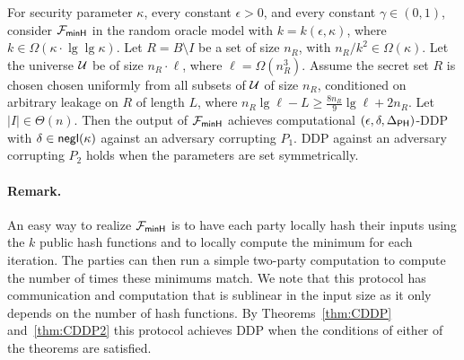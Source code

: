 \begin{theorem}\label{thm:CDDP2}
For security parameter $\kappa$, every constant $\epsilon > 0$, and every
constant $\gamma \in (0,1)$, consider ${\mathcal{F}_\mathsf{minH}}$ in the random oracle model with
$k = k(\epsilon, \kappa)$, where $k \in \Omega(\kappa \cdot \lg\lg\kappa)$. Let
$R = B \setminus I$ be a set of size $n_R$, with $n_R/k^2 \in \Omega(\kappa)$.
Let the universe $\mathcal{U}$ be of size $n_R \cdot \ell$, where $\ell = \Omega(n_R^3)$.
Assume the secret set $R$ is chosen chosen uniformly from all subsets of $\mathcal{U}$ of size $n_R$, conditioned on arbitrary leakage on $R$ of length $L$,
where $n_R \lg \ell - L \ge \frac{8n_R}{9} \lg \ell + 2n_R$.  Let $|I| \in \Theta(n)$.  Then the output of ${\mathcal{F}_\mathsf{minH}}$
achieves computational $(\epsilon, \delta, \Delta_{\mathsf{PH}})$-DDP with $\delta
\in \mathsf{negl}(\kappa)$ against an adversary corrupting $P_1$.  DDP against
an adversary corrupting $P_2$ holds when the parameters are set
symmetrically.  
\end{theorem}

\paragraph{Remark.}  An easy way to realize ${\mathcal{F}_\mathsf{minH}}$ is to have each party locally hash their inputs using the $k$ public hash functions and to locally compute the minimum for each iteration.  The parties can then run a simple two-party computation to compute the number of times these minimums match.  We note that this protocol has communication and computation that is sublinear in the input size as it only depends on the number of hash functions.  By Theorems~\ref{thm:CDDP} and~\ref{thm:CDDP2} this protocol achieves DDP when the conditions of either of the theorems are satisfied.






